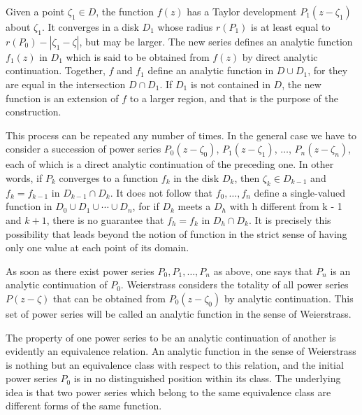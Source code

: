Given a point $\zeta_1 \in D$, the function $f(z)$ has a Taylor development $P_1(z - \zeta_1)$ about $\zeta_1$. It converges in a disk $D_1$ whose radius $r(P_1)$ is at least equal to $r(P_0) - |\zeta_1 - \zeta|$, but may be larger. The new series defines an analytic function $f_1(z)$ in $D_1$ which is said to be obtained from $f(z)$ by direct analytic continuation. Together, $f$ and $f_1$ define an analytic function in $D \cup D_1$, for they are equal in the intersection $D \cap D_1$. If $D_1$ is not contained in $D$, the new function is an extension of $f$ to a larger region, and that is the purpose of the construction.

This process can be repeated any number of times. In the general case we have to consider a succession of power series $P_{0}(z - \zeta_{0})$, $P_{1}(z - \zeta_{1})$, $\ldots$, $P_{n}(z - \zeta_{n})$, each of which is a direct analytic continuation of the preceding one. In other words, if $P_{k}$ converges to a function $f_{k}$ in the disk $D_{k}$, then $\zeta_{k} \in D_{k-1}$ and $f_{k} = f_{k-1}$ in $D_{k-1} \cap D_{k}$. It does not follow that $f_{0}, \ldots, f_{n}$ define a single-valued function in $D_{0} \cup D_{1} \cup \cdots \cup D_{n}$, for if $D_{k}$ meets a $D_{h}$ with h different from k - 1 and $k + 1$, there is no guarantee that $f_{h} = f_{k}$ in $D_{h} \cap D_{k}$. It is precisely this possibility that leads beyond the notion of function in the strict sense of having only one value at each point of its domain.

As soon as there exist power series $P_{0}, P_{1}, \ldots, P_{n}$ as above, one says that $P_{n}$ is an analytic continuation of $P_{0}$. Weierstrass considers the totality of all power series $P(z - \zeta)$ that can be obtained from $P_{0}(z - \zeta_{0})$ by analytic continuation. This set of power series will be called an analytic function in the sense of Weierstrass.

The property of one power series to be an analytic continuation of another is evidently an equivalence relation. An analytic function in the sense of Weierstrass is nothing but an equivalence class with respect to this relation, and the initial power series $P_{0}$ is in no distinguished position within its class. The underlying idea is that two power series which belong to the same equivalence class are different forms of the same function.

